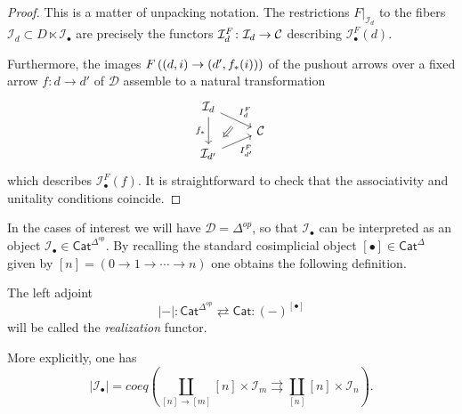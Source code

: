 \documentclass[a4paper,10pt]{article}%
\begin{document}
\begin{proof}
  This is a matter of unpacking notation. The restrictions 
  $F|_{\mathcal{I}_d}$ to the fibers 
  $\mathcal{I}_d \subset D \ltimes \mathcal{I}_{\bullet}$
  are precisely the functors 
  $\mathcal{I}^F_d \colon \mathcal{I}_d \to \mathcal{C}$ describing $\mathcal{I}_{\bullet}^F(d)$.
  
  Furthermore, the images
  $F \left( (d,i) \to (d',f_{\**}(i)) \right)$	
  of the pushout arrows over a fixed arrow $f \colon d \to d'$ of $\mathcal{D}$
  assemble to a natural transformation 
  \begin{equation}
    \begin{tikzcd}[row sep=0.4em]
      \mathcal{I}_d 
      \ar{dr}[name=F1]{I_d^F} \ar{dd}[swap]{f_{\**}} &
      \\
      & \C 
      \\
      |[alias=G2]| \mathcal{I}_{d'}  \ar{ur}[swap]{I_{d'}^F} & 
      \arrow[Rightarrow, from=F1, to=G2,shorten >=0.25cm,shorten <=0.25cm]
    \end{tikzcd}
  \end{equation}
  which describes $\mathcal{I}_{\bullet}^F(f)$. It is straightforward to check that the associativity and unitality conditions coincide.
\end{proof}


In the cases of interest we will have $\mathcal{D}=\Delta^{op}$,
so that $\mathcal{I}_{\bullet}$ can be interpreted as an object $\mathcal{I}_{\bullet} \in \mathsf{Cat}^{\Delta^{op}}$.
By recalling the standard cosimplicial object
$[\bullet] \in \mathsf{Cat}^{\Delta}$ given by 
$[n]=(0 \to 1 \to \cdots \to n)$
one obtains the following definition.


\begin{definition}
  The left adjoint
  \[
  |\minus|\colon
  \mathsf{Cat}^{\Delta^{op}} 
  \rightleftarrows
  \mathsf{Cat} 
  \colon (\minus)^{[\bullet]}
  \]
  will be called the \textit{realization} functor.
\end{definition}


\begin{remark}
  More explicitly, one has
  \begin{equation}\label{REALDEF EQ}
    |\mathcal{I}_{\bullet}| =
    coeq \left(\coprod_{[n] \to [m]}
      [n] \times \mathcal{I}_m
      \rightrightarrows
      \coprod_{[n]} [n] \times \mathcal{I}_n
    \right).
  \end{equation}
\end{remark}
\end{document}
